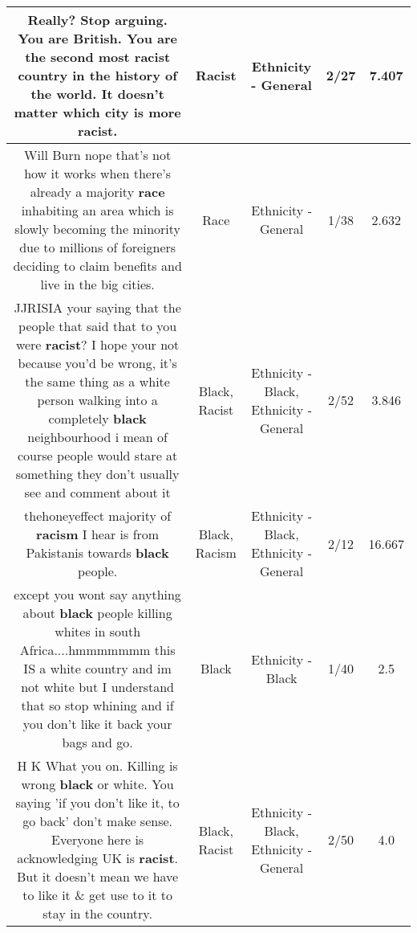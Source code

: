 \documentclass[11pt]{article}
\newlength\mylength
\begin{document}
\begin{center}
\begin{longtable}{|C{.65\mylength}|C{.30\mylength}|C{.12\mylength}|C{.12\mylength}|C{.12\mylength}|}
  \small Really? Stop arguing. You are British. You are the second most \textbf{racist} country in the history of the world. It doesn't matter which city is more \textbf{racist}.\normalsize   & Racist & Ethnicity - General & 2/27 & 7.407 \\  \hline
  \small Will Burn nope that's not how it works when there's already a majority \textbf{race} inhabiting an area which is slowly becoming the minority due to millions of foreigners deciding to claim benefits and live in the big cities.\normalsize   & Race & Ethnicity - General & 1/38 & 2.632 \\  \hline
  \small JJRISIA your saying that the people that said that to you were \textbf{racist}? I hope your not because you'd be wrong, it's the same thing as a white person walking into a completely \textbf{black} neighbourhood i mean of course people would stare at something they don't usually see and comment about it\normalsize   & Black, Racist & Ethnicity - Black, Ethnicity - General & 2/52 & 3.846 \\  \hline
  \small thehoneyeffect majority of \textbf{racism} I hear is from Pakistanis towards \textbf{black} people.\normalsize   & Black, Racism & Ethnicity - Black, Ethnicity - General & 2/12 & 16.667 \\  \hline
  \small except you wont say anything about \textbf{black} people killing whites in south Africa....hmmmmmmm this IS a white country and im not white but I understand that so stop whining and if you don't like it back your bags and go.\normalsize   & Black & Ethnicity - Black & 1/40 & 2.5 \\  \hline
  \small H K What you on. Killing is wrong \textbf{black} or white. You saying 'if you don't like it, to go back' don't make sense. Everyone here is acknowledging UK is \textbf{racist}. But it doesn't mean we have to like it \& get use to it to stay in the country.\normalsize   & Black, Racist & Ethnicity - Black, Ethnicity - General & 2/50 & 4.0 \\  \hline

\end{longtable}
\end{center}
\end{document}
